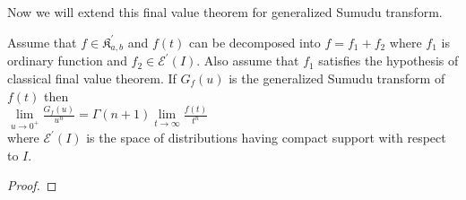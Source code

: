 Now we will extend this final value theorem for generalized Sumudu transform.
\begin{theorem}
Assume that $f\in \mathfrak{K}_{a,b}^{'}$ and $f(t)$ can be decomposed into $ f=f_{1}+f_{2} $ where $ f_{1} $ is ordinary function and $ f_{2}\in \mathcal{E}^{'}(I) $. Also assume that $ f_{1} $ satisfies the hypothesis of classical final value theorem. If $ G_{f}(u) $ is the generalized Sumudu transform of $f(t)$ then\\
$\underset{u\rightarrow 0^{+}}\lim \frac{G_{f}(u) }{u^{n}} = \Gamma{(n+1)}\underset{t\rightarrow \infty}\lim \frac{f(t)}{t^{n}}$\\
where $\mathcal{E}^{'}(I)$ is the space of distributions having compact support with respect to $I$.
\end{theorem}

\begin{proof}


\end{proof}
